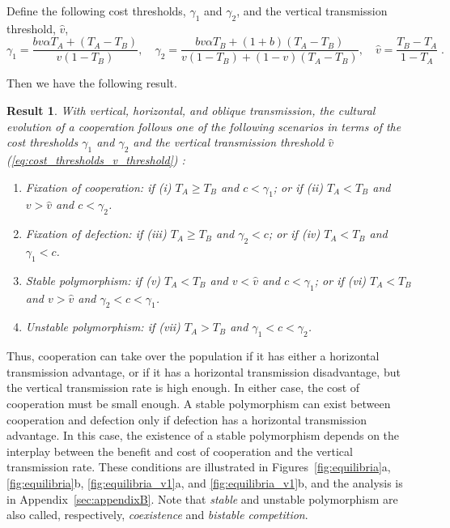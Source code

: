 \documentclass[12pt]{extarticle}
\newtheorem{result}{Result}
\begin{document}
Define the following cost thresholds, $\gamma_1$ and $\gamma_2$, and the vertical transmission threshold, $\hat v$,
\begin{equation} \label{eq:cost_thresholds_v_threshold} 
\gamma_1 = \frac{b v \alpha T_A + (T_A - T_B)}{v(1-T_B)}, \quad
\gamma_2 = \frac{b v \alpha T_B + (1+b) (T_A - T_B)}{v(1-T_B) + (1-v)(T_A-T_B)}, \quad
\hat v = \frac{T_B - T_A}{1-T_A} \;.
\end{equation}

Then we have the following result.
\\

\begin{result}%
\label{result:vert_obli_hori}
With vertical, horizontal, and oblique transmission, the cultural evolution of a cooperation follows one of the following scenarios in terms of the cost thresholds $\gamma_1$ and $\gamma_2$ and the vertical transmission threshold $\hat v$ (\autoref{eq:cost_thresholds_v_threshold}) :

\begin{enumerate}
\item \emph{Fixation of cooperation}: 
	if \emph{(i)} $T_A \ge T_B$ and $c < \gamma_1$; or 
	if \emph{(ii)} $T_A < T_B$ and $v>\hat v$ and $c < \gamma_2$.
\item \emph{Fixation of defection}: 
    if \emph{(iii)} $T_A \ge T_B$ and $\gamma_2 < c$; or 
	if \emph{(iv)} $T_A < T_B$ and $\gamma_1 < c$.
\item \emph{Stable polymorphism}: 
    if \emph{(v)} $T_A < T_B$ and $v<\hat{v}$ and $c < \gamma_1$; or 
    if \emph{(vi)} $T_A < T_B$ and $v>\hat{v}$ and $\gamma_2 < c < \gamma_1$.
\item \emph{Unstable polymorphism}:
    if \emph{(vii)} $T_A > T_B$ and $\gamma_1 < c < \gamma_2$.
\end{enumerate}

\end{result}
Thus, cooperation can take over the population if it has either a horizontal transmission advantage, or if it has a horizontal transmission disadvantage, but the vertical transmission rate is high enough.
In either case, the cost of cooperation must be small enough.
A stable polymorphism can exist between cooperation and defection only if defection has a horizontal transmission advantage.
In this case, the existence of a stable polymorphism depends on the interplay between the benefit and cost of cooperation and the vertical transmission rate.
These conditions are illustrated in Figures~\ref{fig:equilibria}a, \ref{fig:equilibria}b, \ref{fig:equilibria_v1}a, and \ref{fig:equilibria_v1}b, and the analysis is in Appendix~\ref{sec:appendixB}.
Note that \emph{stable} and {unstable polymorphism} are also called, respectively, \emph{coexistence} and \emph{bistable competition}.
\end{document}
